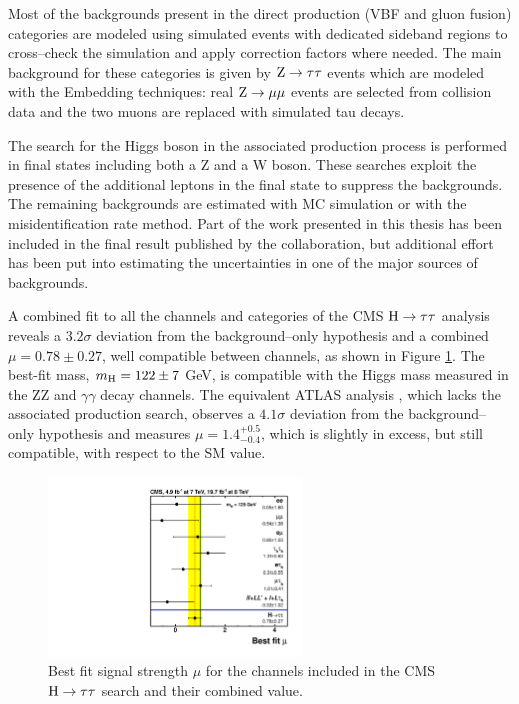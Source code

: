 Most of the backgrounds present in the direct production (VBF and gluon fusion) categories are modeled using simulated events with dedicated sideband regions to cross--check the simulation and apply correction factors where needed. The main background for these categories is given by $\mathrm{Z} \rightarrow \tau\tau$ events which are modeled with the Embedding techniques: real $\mathrm{Z} \rightarrow \mu \mu$ events are selected from collision data and the two muons are replaced with simulated tau decays.

The search for the Higgs boson in the associated production process is performed in final states including both a Z and a W boson. These searches exploit the presence of the additional leptons in the final state to suppress the backgrounds. The remaining backgrounds are estimated with MC simulation or with the misidentification rate method. Part of the work presented in this thesis has been included in the final result published by the collaboration, but additional effort has been put into estimating the uncertainties in one of the major sources of backgrounds. 

A combined fit to all the channels and categories of the CMS $\mathrm{H} \rightarrow \tau\tau$ analysis reveals a $3.2\sigma$ deviation from the background--only hypothesis and a combined $\mu = 0.78 \pm 0.27$, well compatible between channels, as shown in Figure \ref{fig:htt_mu}. The best-fit mass, $m_{\mathrm{H}} = 122 \pm 7$ GeV, is compatible with the Higgs mass measured in the ZZ and $\gamma\gamma$ decay channels. The equivalent ATLAS analysis \cite{ATLASCONF:2013108}, which lacks the associated production search, observes a $4.1\sigma$ deviation from the background--only hypothesis and measures $\mu = 1.4^{+0.5}_{-0.4}$, which is slightly in excess, but still compatible, with respect to the SM value.

\begin{figure}
        \centering
	\includegraphics[width=0.6\textwidth]{1_Introduction_Th_and_Exp/pics/BestFit_sm_per_chn.pdf}
       \caption{Best fit signal strength $\mu$ for the channels included in the CMS $\mathrm{H} \rightarrow \tau \tau$ search and their combined value.}
       \label{fig:htt_mu}
\end{figure}

